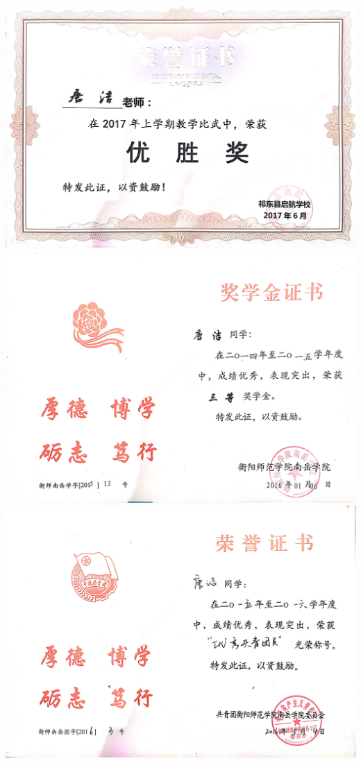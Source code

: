 \documentclass[UFT8]{ctexart}%
\begin{document}
\begin{center}
 \includegraphics[scale=0.16]{figs/201706.JPG }
 \includegraphics[scale=0.1]{figs/20160106.JPG }
 \includegraphics[scale=0.1]{figs/20160504.JPG }

\end{center}
\end{document}
